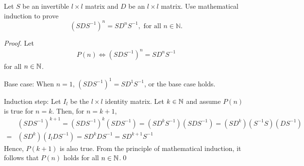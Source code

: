 \begin{question}
\normalfont
Let $S$ be an invertible $l \times l$ matrix and $D$ be an $l \times l$ matrix. Use mathematical induction to prove 
$$
\left(S D S^{-1} \right)^n = S D^n S^{-1}, \text{ for all } n \in \mathbb{N}.
$$ 
\end{question}

\begin{proof}
    \renewcommand{\qedsymbol}{$\blacksquare$}
    Let 
    \[
        \begin{aligned}
            P(n)\iff(SDS^{-1})^n=SD^nS^{-1}
        \end{aligned}
    \] for all $n\in\mathbb N$.
    
    Base case: When $n=1$, $(SDS^{-1})^1=SD^1S^{-1}$, or the base case holds.

    Induction step: Let $I_l$ be the $l\times l$ identity matrix. Let $k\in\mathbb N$ and assume $P(n)$ is true for $n=k$.
    Then, for $n=k+1$, 
    \[
        \begin{aligned}
            &(SDS^{-1})^{k+1}
            =(SDS^{-1})^k(SDS^{-1})
            =(SD^kS^{-1})(SDS^{-1})
            =(SD^k)(S^{-1}S)(DS^{-1})\\
            =&(SD^k)(I_lDS^{-1})
            =SD^kDS^{-1}
            =SD^{k+1}S^{-1}
        \end{aligned}
    \]
    Hence, $P(k+1)$ is also true. From the principle of mathematical induction, it follows that $P(n)$ holds for all $n\in\mathbb N$.\qed
    \renewcommand{\qedsymbol}{}
\end{proof}